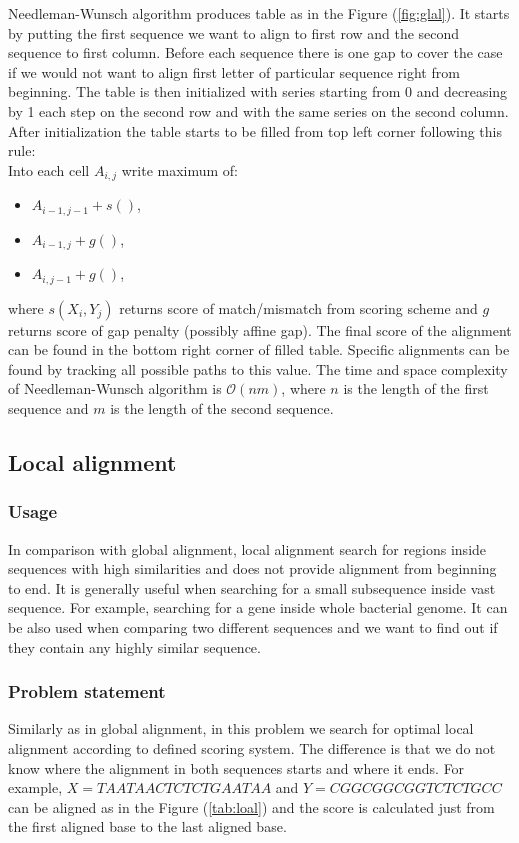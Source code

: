Needleman-Wunsch algorithm produces table as in the Figure (\ref{fig:glal}). 
It starts by putting the first sequence we want to align to first row and the second sequence to first column.
Before each sequence there is one gap to cover the case if we would not want to align first letter of particular sequence right from beginning.
The table is then initialized with series starting from 0 and decreasing by 1 each step on the second row and with the same series on the second column.
After initialization the table starts to be filled from top left corner following this rule:\\
Into each cell $A_{i,j}$ write maximum of:
\begin{itemize}
\item $A_{i-1, j-1} + s()$,
\item $A_{i-1, j} + g()$,
\item $A_{i, j-1} + g()$,
\end{itemize}
where $s(X_i, Y_j)$ returns score of match/mismatch from scoring scheme and $g$ returns score of gap penalty (possibly affine gap).
The final score of the alignment can be found in the bottom right corner of filled table.
Specific alignments can be found by tracking all possible paths to this value.
The time and space complexity of Needleman-Wunsch algorithm is $\mathcal{O}(nm)$, where $n$ is the length of the first sequence and $m$ is the length of the second sequence.

\subsection{Local alignment}
\subsubsection{Usage}
In comparison with global alignment, local alignment search for regions inside sequences with high similarities and does not provide alignment from beginning to end.
It is generally useful when searching for a small subsequence inside vast sequence.
For example, searching for a gene inside whole bacterial genome.
It can be also used when comparing two different sequences and we want to find out if they contain any highly similar sequence.

\subsubsection{Problem statement}
Similarly as in global alignment, in this problem we search for optimal local alignment according to defined scoring system.
The difference is that we do not know where the alignment in both sequences starts and where it ends.
For example, $ X = TAATAACTCTCTGAATAA $ and $ Y = CGGCGGCGGTCTCTGCC $ can be aligned as in the Figure (\ref{tab:loal}) and the score is calculated just from the first aligned base to the last aligned base.

